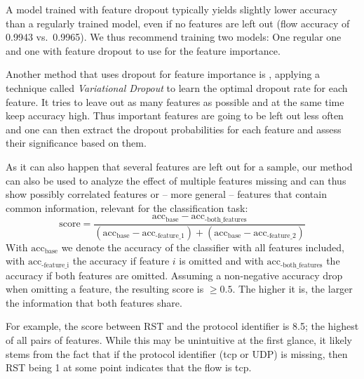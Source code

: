 \documentclass[conference]{IEEEtran}
\begin{document}
A model trained with feature dropout typically yields slightly lower accuracy than a regularly trained model, even if no features are left out (flow accuracy of 0.9943 vs.~0.9965). We thus recommend training two models: One regular one and one with feature dropout to use for the feature importance.

Another method that uses dropout for feature importance is \cite{chang_dropout_2017}, applying a technique called \textit{Variational Dropout} to learn the optimal dropout rate for each feature. It tries to leave out as many features as possible and at the same time keep accuracy high. Thus important features are going to be left out less often and one can then extract the dropout probabilities for each feature and assess their significance based on them.

As it can also happen that several features are left out for a sample, our method can also be used to analyze the effect of multiple features missing and can thus show possibly correlated features or -- more general -- features that contain common information, relevant for the classification task:
\begin{equation}
\text{score} = \frac{\text{acc}_\text{base}-\text{acc}_\text{-both\_features}}{\left(\text{acc}_\text{base}-\text{acc}_\text{-feature\_1}\right) + \left(\text{acc}_\text{base}-\text{acc}_\text{-feature\_2}\right)}
\end{equation}
With $\text{acc}_\text{base}$ we denote the accuracy of the classifier with all features included, with $\text{acc}_\text{-feature\_i}$ the accuracy if feature $i$ is omitted and with $\text{acc}_\text{-both\_features}$ the accuracy if both features are omitted. Assuming a non-negative accuracy drop when omitting a feature, the resulting score is $\ge 0.5$. The higher it is, the larger the information that both features share.

For example, the score between RST and the protocol identifier is 8.5; the highest of all pairs of features. While this may be unintuitive at the first glance, it likely stems from the fact that if the protocol identifier (\gls{tcp} or UDP) is missing, then 
RST being 1 at some point indicates that the flow is \gls{tcp}.
\end{document}
